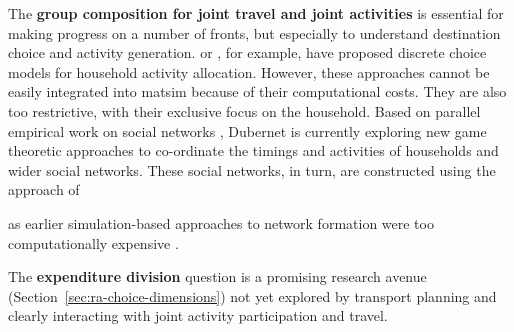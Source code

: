 The \textbf{group composition for joint travel and joint activities} is essential for making progress on a number of fronts, but especially to understand destination choice and activity generation. 
\citet{GliebeKoppelman_Transportation_2005} or
\citet{ZhangEtAl_TransResB_2005},
for example, have proposed discrete choice models for household activity allocation. However, these approaches cannot be easily integrated into \gls{matsim} because of their computational costs. They are also too restrictive, with their exclusive focus on the household.  Based on parallel empirical work on social networks 
\citep[see][]{LarsenEtAl_MOB_2006,KowaldEtAl_JTG_2013},
Dubernet is currently exploring new game theoretic approaches to co-ordinate the timings and activities of households and wider social networks. These social networks, in turn, are constructed using the approach of 

as earlier simulation-based approaches to network formation were too computationally expensive \citep[e.g.,][]{Hackney_PhDThesis_2009}.

The \textbf{expenditure division} question is a promising research avenue (Section~\ref{sec:ra-choice-dimensions}) not yet explored by transport planning and clearly interacting with joint activity participation and travel. 

